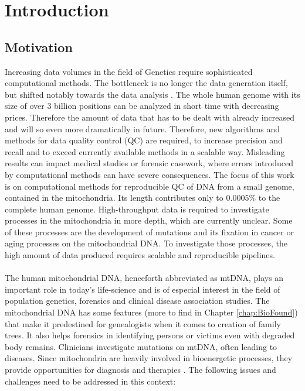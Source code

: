 \chapter{Introduction}
\label{chapterIntro}
\section{Motivation}
Increasing data volumes in the field of Genetics require sophisticated computational methods. The bottleneck is no longer the data generation itself, but shifted notably towards the data analysis \cite{forer2014delivering}. The whole human genome with its size of over 3 billion positions can be analyzed in short time with decreasing prices. Therefore the amount of data that has to be dealt with already increased and will so even more dramatically in future. Therefore, new algorithms and methods for data quality control (QC) are required, to  increase precision and recall and to exceed currently available methods in a scalable way. Misleading results can impact medical studies or forensic casework, where errors introduced by computational methods can have severe consequences. The focus of this work is on computational methods for reproducible QC of DNA from a small genome, contained in the mitochondria. Its length contributes only to $0.0005\%$ to the complete human genome. High-throughput data is required to investigate processes in the mitochondria in more depth, which are currently unclear. Some of these processes are the development of mutations and its fixation in cancer or aging processes on the mitochondrial DNA. To investigate those processes, the high amount of data produced   requires scalable and reproducible pipelines. 
\\
\\
The human mitochondrial DNA, henceforth abbreviated as mtDNA, plays an important role in today's life-science and is of especial interest in the field of population genetics, forensics and clinical disease association studies. The mitochondrial DNA has some features (more to find in Chapter \ref{chap:BioFound}) that make it predestined for genealogists when it comes to creation of family trees. It also helps forensics in identifying persons or victims even with degraded body remains. Clinicians investigate mutations on mtDNA, often leading to diseases. Since mitochondria are heavily involved in bioenergetic processes, they provide opportunities for diagnosis and therapies \cite{Picard2016}.
The following issues and challenges need to be addressed in this context:
